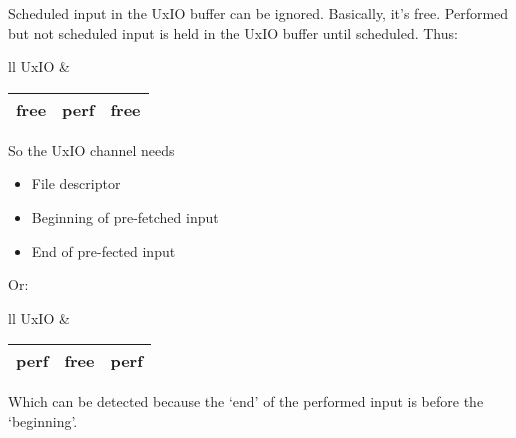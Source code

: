 \documentclass{article}
\begin{document}
Scheduled input in the UxIO buffer can be ignored.
Basically, it's free.
Performed but not scheduled input is held in the UxIO buffer until scheduled.
Thus:

\begin{tabular}{ll}
    UxIO & \begin{tabular}{|c|c|c|}
        \hline
        free & perf & free \\
        \hline
    \end{tabular}
\end{tabular}

So the UxIO channel needs
\begin{itemize}
    \item File descriptor
    \item Beginning of pre-fetched input
    \item End of pre-fected input
\end{itemize}

Or:

\begin{tabular}{ll}
    UxIO & \begin{tabular}{|c|c|c|}
        \hline
        perf & free & perf \\
        \hline
    \end{tabular}
\end{tabular}

Which can be detected because the `end' of the performed input is before the `beginning'.
\end{document}

